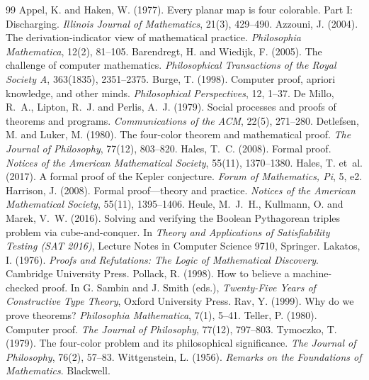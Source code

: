 \documentclass{situationist-preprint}
\begin{document}
\begin{thebibliography}{99}\small
{} Appel, K. and Haken, W. (1977). Every planar map is four colorable. Part I: Discharging. \emph{Illinois Journal of Mathematics}, 21(3), 429--490.
 Azzouni, J. (2004). The derivation-indicator view of mathematical practice. \emph{Philosophia Mathematica}, 12(2), 81--105.
 Barendregt, H. and Wiedijk, F. (2005). The challenge of computer mathematics. \emph{Philosophical Transactions of the Royal Society A}, 363(1835), 2351--2375.
 Burge, T. (1998). Computer proof, apriori knowledge, and other minds. \emph{Philosophical Perspectives}, 12, 1--37.
 De Millo, R.~A., Lipton, R.~J. and Perlis, A.~J. (1979). Social processes and proofs of theorems and programs. \emph{Communications of the ACM}, 22(5), 271--280.
 Detlefsen, M. and Luker, M. (1980). The four-color theorem and mathematical proof. \emph{The Journal of Philosophy}, 77(12), 803--820.
 Hales, T.~C. (2008). Formal proof. \emph{Notices of the American Mathematical Society}, 55(11), 1370--1380.
 Hales, T. et~al. (2017). A formal proof of the Kepler conjecture. \emph{Forum of Mathematics, Pi}, 5, e2.
 Harrison, J. (2008). Formal proof---theory and practice. \emph{Notices of the American Mathematical Society}, 55(11), 1395--1406.
 Heule, M.~J.~H., Kullmann, O. and Marek, V.~W. (2016). Solving and verifying the Boolean Pythagorean triples problem via cube-and-conquer. In \emph{Theory and Applications of Satisfiability Testing (SAT 2016)}, Lecture Notes in Computer Science 9710, Springer.
 Lakatos, I. (1976). \emph{Proofs and Refutations: The Logic of Mathematical Discovery}. Cambridge University Press.
 Pollack, R. (1998). How to believe a machine-checked proof. In G. Sambin and J. Smith (eds.), \emph{Twenty-Five Years of Constructive Type Theory}, Oxford University Press.
 Rav, Y. (1999). Why do we prove theorems? \emph{Philosophia Mathematica}, 7(1), 5--41.
 Teller, P. (1980). Computer proof. \emph{The Journal of Philosophy}, 77(12), 797--803.
 Tymoczko, T. (1979). The four-color problem and its philosophical significance. \emph{The Journal of Philosophy}, 76(2), 57--83.
 Wittgenstein, L. (1956). \emph{Remarks on the Foundations of Mathematics}. Blackwell.
\end{thebibliography}
\end{document}
